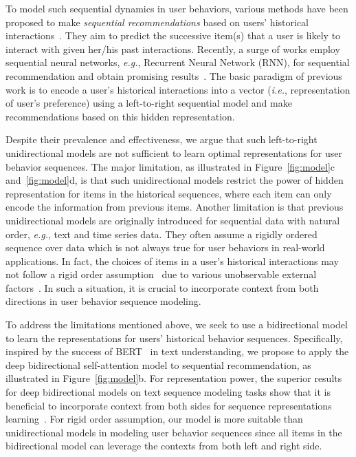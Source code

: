 To model such sequential dynamics in user behaviors, various methods have been proposed to make \textit{sequential recommendations} based on users' historical interactions~\cite{Rendle:WWW2010:FPM,Hidasi:ICLR2016:gru4rec,Kang:ICDM2018:SAS}. They aim to predict the successive item(s) that a user is likely to interact with given her/his past interactions. Recently, a surge of works employ sequential neural networks, \textit{e.g.}, Recurrent Neural Network (RNN), for sequential recommendation and obtain promising results~\cite{Hidasi:ICLR2016:gru4rec,Yu:sigir2016:DRM,Wu:wsdm2017:RRN,Donkers:recsys2017:SUR,Hidasi:CIKM2018:RNN}. The basic paradigm of previous work is to encode a user's historical interactions into a vector (\textit{i.e.}, representation of user's preference) using a left-to-right sequential model and make recommendations based on this hidden representation.

Despite their prevalence and effectiveness, we argue that such left-to-right unidirectional models are not sufficient to learn optimal representations for user behavior sequences. The major limitation, as illustrated in Figure~\ref{fig:model}c and~\ref{fig:model}d, is that such unidirectional models restrict the power of hidden representation for items in the historical sequences, where each item can only encode the information from previous items. Another limitation is that previous unidirectional models are originally introduced for sequential data with natural order, \textit{e.g.}, text and time series data. They often assume a rigidly ordered sequence over data which is not always true for user behaviors in real-world applications. In fact, the choices of items in a user's historical interactions may not follow a rigid order assumption~\cite{Hu:ijcai2017:Diversifying,Wang:aaai2018:atem} due to various unobservable external factors~\cite{Covington:recsys2016:DNN}. In such a situation, it is crucial to incorporate context from both directions in user behavior sequence modeling.

To address the limitations mentioned above, we seek to use a bidirectional model to learn the representations for users' historical behavior sequences. Specifically, inspired by the success of BERT~\cite{Devlin:2018:BERT} in text understanding, we propose to apply the deep bidirectional self-attention model to sequential recommendation, as illustrated in Figure~\ref{fig:model}b. 
For representation power, the superior results for deep bidirectional models on text sequence modeling tasks show that it is beneficial to incorporate context from both sides for sequence representations learning~\cite{Devlin:2018:BERT}. For rigid order assumption, our model is more suitable than unidirectional models in modeling user behavior sequences since all items in the bidirectional model can leverage the contexts from both left and right side.

